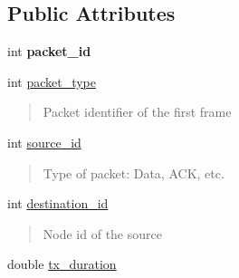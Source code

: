 \subsection*{Public Attributes}
\begin{DoxyCompactItemize}
\item 
\mbox{\label{structNotification_a9fecc49917b3c9ca69b20ed7a0c91c59}} 
int {\bfseries packet\+\_\+id}
\item 
\mbox{\label{structNotification_afe3dc85424cded1a3c2076bbc641dcd7}} 
int \hyperlink{structNotification_afe3dc85424cded1a3c2076bbc641dcd7}{packet\+\_\+type}
\begin{DoxyCompactList}\small\item\em \begin{quote}
Packet identifier of the first frame \end{quote}
\end{DoxyCompactList}\item 
\mbox{\label{structNotification_a7f2170a750a23aa91940c0579ec6cbe4}} 
int \hyperlink{structNotification_a7f2170a750a23aa91940c0579ec6cbe4}{source\+\_\+id}
\begin{DoxyCompactList}\small\item\em \begin{quote}
Type of packet\+: Data, A\+CK, etc. \end{quote}
\end{DoxyCompactList}\item 
\mbox{\label{structNotification_a414df0d49c275659d4a4475e3de9c538}} 
int \hyperlink{structNotification_a414df0d49c275659d4a4475e3de9c538}{destination\+\_\+id}
\begin{DoxyCompactList}\small\item\em \begin{quote}
Node id of the source \end{quote}
\end{DoxyCompactList}\item 
\mbox{\label{structNotification_af517be5564ab353c4beaa1aecd18f935}} 
double \hyperlink{structNotification_af517be5564ab353c4beaa1aecd18f935}{tx\+\_\+duration}
\begin{DoxyCompactList}\small\item\em \begin{quote}

\end{quote}
\end{DoxyCompactList}
\end{DoxyCompactItemize}
